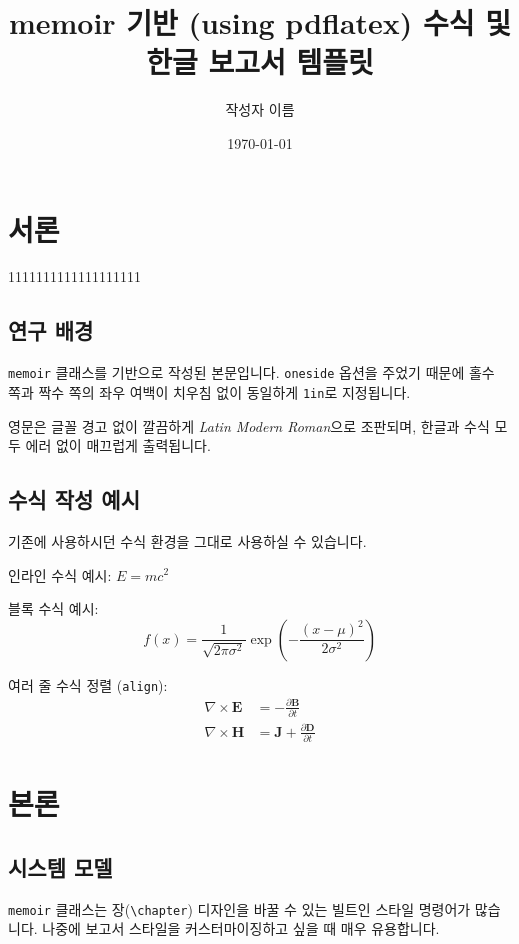\documentclass[12pt, a4paper, oneside]{memoir}
\title{memoir 기반 (using pdflatex) 수식 및 한글 보고서 템플릿}
\author{작성자 이름}
\date{\today}
\begin{document}
\maketitle

\tableofcontents
\newpage

\chapter{서론}
1111111111111111111
\section{연구 배경}
\texttt{memoir} 클래스를 기반으로 작성된 본문입니다. \texttt{oneside} 옵션을 주었기 때문에 홀수 쪽과 짝수 쪽의 좌우 여백이 치우침 없이 동일하게 \texttt{1in}로 지정됩니다. 

영문은 글꼴 경고 없이 깔끔하게 \textit{Latin Modern Roman}으로 조판되며, 한글과 수식 모두 에러 없이 매끄럽게 출력됩니다.

\section{수식 작성 예시}
기존에 사용하시던 수식 환경을 그대로 사용하실 수 있습니다.

인라인 수식 예시: $E = mc^2$

블록 수식 예시:
\begin{equation}
    f(x) = \frac{1}{\sqrt{2\pi\sigma^2}} \exp\left( -\frac{(x-\mu)^2}{2\sigma^2} \right)
\end{equation}

여러 줄 수식 정렬 (\texttt{align}):
\begin{align}
    \nabla \times \mathbf{E} &= -\frac{\partial \mathbf{B}}{\partial t} \\
    \nabla \times \mathbf{H} &= \mathbf{J} + \frac{\partial \mathbf{D}}{\partial t}
\end{align}

\chapter{본론}
\section{시스템 모델}
\texttt{memoir} 클래스는 장(\texttt{\textbackslash chapter}) 디자인을 바꿀 수 있는 빌트인 스타일 명령어가 많습니다. 나중에 보고서 스타일을 커스터마이징하고 싶을 때 매우 유용합니다.
\end{document}
